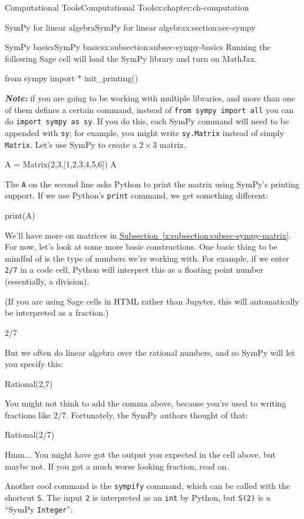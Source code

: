 \documentclass[oneside,10pt,]{book}
\newcommand{\mono}[1]{\texttt{#1}}
\newcommand{\alert}[1]{\textbf{\textit{#1}}}
\numberwithin{equation}{section}
\begin{document}
\begin{chapterptx}{Computational Tools}{}{Computational Tools}{}{}{x:chapter:ch-computation}
\begin{sectionptx}{SymPy for linear algebra}{}{SymPy for linear algebra}{}{}{x:section:sec-sympy}
\begin{subsectionptx}{SymPy basics}{}{SymPy basics}{}{}{x:subsection:subsec-sympy-basics}
Running the following Sage cell will load the SymPy library and turn on MathJax.%
\begin{sageinput}
from sympy import *
init_printing()
\end{sageinput}
\alert{Note:} if you are going to be working with multiple libraries, and more than one of them defines a certain command, instead of \mono{from sympy import all} you can do \mono{import sympy as sy}. If you do this, each SymPy command will need to be appended with \mono{sy}; for example, you might write \mono{sy.Matrix} instead of simply \mono{Matrix}. Let's use SymPy to create a \(2\times 3\) matrix.%
\begin{sageinput}
A = Matrix(2,3,[1,2,3,4,5,6])
A
\end{sageinput}
The \mono{A} on the second line asks Python to print the matrix using SymPy's printing support. If we use Python's \mono{print} command, we get something different:%
\begin{sageinput}
print(A)
\end{sageinput}
We'll have more on matrices in \hyperref[x:subsection:subsec-sympy-matrix]{Subsection~\ref{x:subsection:subsec-sympy-matrix}}. For now, let's look at some more basic constructions. One basic thing to be mindful of is the type of numbers we're working with. For example, if we enter \mono{2/7} in a code cell, Python will interpret this as a floating point number (essentially, a division).%
\par
(If you are using Sage cells in HTML rather than Jupyter, this will automatically be interpreted as a fraction.)%
\begin{sageinput}
2/7
\end{sageinput}
But we often do linear algebra over the rational numbers, and so SymPy will let you specify this:%
\begin{sageinput}
Rational(2,7)
\end{sageinput}
You might not think to add the comma above, because you're used to writing fractions like \(2/7\). Fortunately, the SymPy authors thought of that:%
\begin{sageinput}
Rational(2/7)
\end{sageinput}
Hmm... You might have got the output you expected in the cell above, but maybe not. If you got a much worse looking fraction, read on.%
\par
Another cool command is the \mono{sympify} command, which can be called with the shortcut \mono{S}. The input \mono{2} is interpreted as an \mono{int} by Python, but \mono{S(2)} is a ``SymPy \mono{Integer}'':%

\end{subsectionptx}
\end{sectionptx}
\end{chapterptx}
\end{document}
